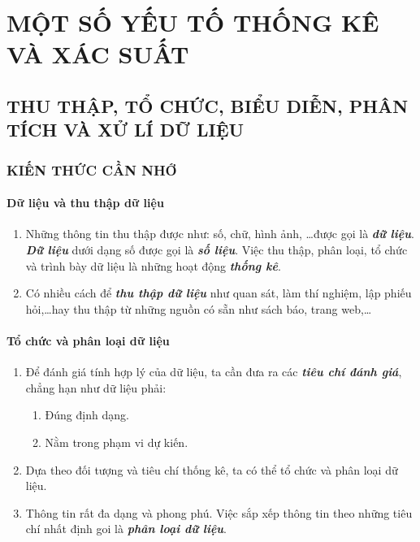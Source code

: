 \def\i{\item}
\graphicspath{{../pictures/c5/}}
\chapter{MỘT SỐ YẾU TỐ THỐNG KÊ VÀ XÁC SUẤT}
\section{THU THẬP, TỔ CHỨC, BIỂU DIỄN, PHÂN TÍCH VÀ XỬ LÍ DỮ LIỆU}
\subsection{KIẾN THỨC CẦN NHỚ}
\subsubsection{Dữ liệu và thu thập dữ liệu}
\begin{enumerate}[--,leftmargin=*]
	\i Những thông tin thu thập được như: số, chữ, hình ảnh, \ldots được gọi là \textbf{\textit{dữ liệu}}. \textbf{\textit{Dữ liệu}} dưới dạng số được gọi là \textbf{\textit{số liệu}}. Việc thu thập, phân loại, tổ chức và trình bày dữ liệu là những hoạt động \textbf{\textit{thống kê}}.
	\i Có nhiều cách để \textbf{\textit{thu thập dữ liệu}} như quan sát, làm thí nghiệm, lập phiếu hỏi,\ldots hay thu thập từ những nguồn có sẵn như sách báo, trang web,\ldots
\end{enumerate}
\subsubsection{Tổ chức và phân loại dữ liệu}
\begin{enumerate}[--,leftmargin=*]
	\i Để đánh giá tính hợp lý của dữ liệu, ta cần đưa ra các \textbf{\textit{tiêu chí đánh giá}}, chẳng hạn như dữ liệu phải:
	\begin{enumerate}[+,leftmargin=*]
		\i Đúng định dạng.
		\i Nằm trong phạm vi dự kiến.
	\end{enumerate}
	\i Dựa theo đối tượng và tiêu chí thống kê, ta có thể tổ chức và phân loại dữ liệu.
	\i Thông tin rất đa dạng và phong phú. Việc sắp xếp thông tin theo những tiêu chí nhất định goi là \textbf{\textit{phân loại dữ liệu}}.
\end{enumerate}
